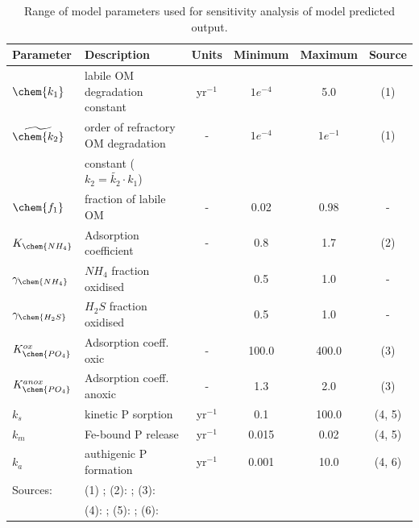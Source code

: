 \documentclass[gmd, manuscript]{copernicus}
\begin{document}
\begin{table}[btp]
\caption{Range of model parameters used for sensitivity analysis of model predicted output.} 
\centering
\begin{tabular}{l l c c c c}
\hline\hline
Parameter & Description & Units & Minimum  & Maximum & Source\\
\hline
$\chem{k_1}$ & labile OM degradation constant & yr$^{-1}$ & $1e^{-4}$ & 5.0 & (1)\\
$\widetilde{\chem{k_2}}$ & order of refractory OM degradation & - & $1e^{-4}$ & $1e^{-1}$ &  (1)\\
 & constant ($k_2 = \widetilde{k_2} \cdot k_1$) & & &  &\\
$\chem{f_1}$ & fraction of labile OM & - & 0.02 & 0.98  & - \\
$K_{\chem{NH_4}}$ & Adsorption coefficient & - & 0.8 & 1.7  & (2) \\
$\gamma_\chem{NH_4}$ & $NH_4$ fraction oxidised &  & 0.5 & 1.0 & - \\
$\gamma_\chem{H_2S}$ &  $H_2S$ fraction oxidised  &  & 0.5 & 1.0 & - \\
$K_\chem{PO_4}^{ox}$ & Adsorption coeff. oxic & - & 100.0 & 400.0  & (3) \\
$K_\chem{PO_4}^{anox}$ & Adsorption coeff. anoxic & - & 1.3 & 2.0 & (3) \\
$k_{s}$ & kinetic P sorption & yr$^{-1}$  & 0.1 & 100.0 & (4, 5)\\
$k_{m}$ & Fe-bound P release & yr$^{-1}$  & 0.015 & 0.02 & (4, 5)\\
$k_{a}$ & authigenic P formation & yr$^{-1}$  & 0.001 & 10.0 & (4, 6)\\
\hline
Sources: &\multicolumn{5}{l}{(1) \citet{arndt_quantifying_2013}; (2): \citet{cappellen_cycling_1996}; (3): \citet{krom_adsorption_1980}}\\
&\multicolumn{5}{l}{(4): \citet{gypens_simple_2008}; (5): \citet{caroline_p_slomp_key_1996}; (6): \citet{cappellen_mathematical_1988}}
\end{tabular}
\label{table:SA_parameter_ranges}
\end{table}
\end{document}
